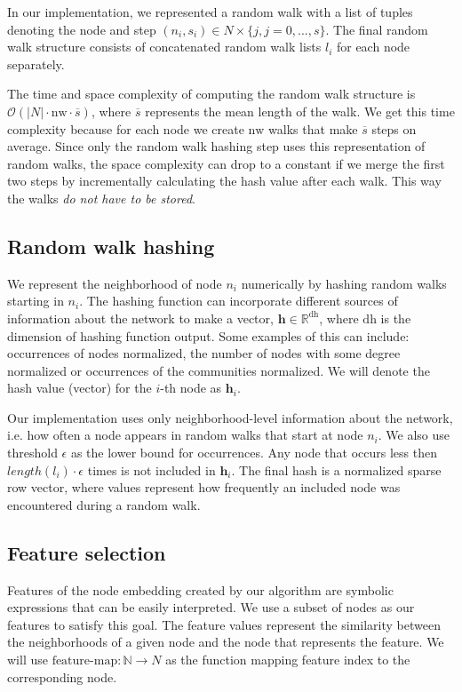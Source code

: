 \documentclass[twoside,11pt]{article}
\begin{document}
In our implementation, we represented a random walk with a list of tuples denoting the node and step $(n_i, s_i) \in N \times \{j, j=0, ..., s\}$. The final random walk structure consists of concatenated random walk lists $l_i$ for each node separately.

The time and space complexity of computing the random walk structure is $\mathcal{O}(|N| \cdot \textrm{nw} \cdot \overline{s})$, where $\overline{s}$ represents the mean length of the walk. We get this time complexity because for each node we create $\textrm{nw}$ walks that make $\overline{s}$ steps on average. Since only the random walk hashing step uses this representation of random walks, the space complexity can drop to a constant if we merge the first two steps by incrementally calculating the hash value after each walk. This way the walks \emph{do not have to be stored}.

\subsection{Random walk hashing}
\label{walkhash}
We represent the neighborhood of node $n_i$ numerically by hashing random walks starting in $n_i$. The hashing function can incorporate different sources of information about the network to make a vector, $\boldsymbol{h} \in \mathbb{R}^{\textrm{dh}}$, where $\textrm{dh}$ is the dimension of hashing function output. Some examples of this can include: occurrences of nodes normalized, the number of nodes with some degree normalized or occurrences of the communities normalized. We will denote the hash value (vector) for the $i$-th node as $\boldsymbol{h}_i$.

Our implementation uses only neighborhood-level information about the network, i.e. how often a node appears in random walks that start at node $n_i$. We also use threshold $\epsilon$ as the lower bound for occurrences. Any node that occurs less then $length(l_i)\cdot\epsilon$ times is not included in $\boldsymbol{h}_i$. The final hash is a normalized sparse row vector, where values represent how frequently an included node was encountered during a random walk.

\subsection{Feature selection}
\label{sec:featselection}
Features of the node embedding created by our algorithm are symbolic expressions that can be easily interpreted. We use a subset of nodes as our features to satisfy this goal. The feature values represent the similarity between the neighborhoods of a given node and the node that represents the feature. We will use $\textrm{feature-map}:\mathbb{N}\to N$ as the function mapping feature index to the corresponding node. 
\end{document}
